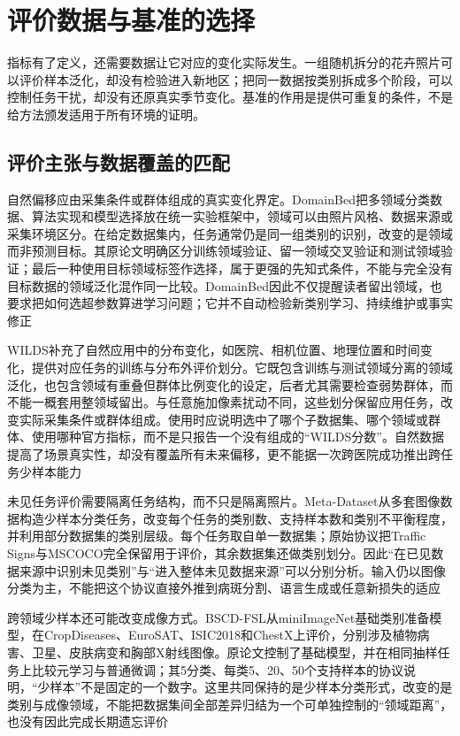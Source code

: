 \section{评价数据与基准的选择}
\label{sec:ket-evaluation-data}

指标有了定义，还需要数据让它对应的变化实际发生。一组随机拆分的花卉照片可以评价样本泛化，却没有检验进入新地区；把同一数据按类别拆成多个阶段，可以控制任务干扰，却没有还原真实季节变化。基准的作用是提供可重复的条件，不是给方法颁发适用于所有环境的证明。

\subsection{评价主张与数据覆盖的匹配}
\label{sec:ket-evaluation-coverage}

自然偏移应由采集条件或群体组成的真实变化界定。DomainBed把多领域分类数据、算法实现和模型选择放在统一实验框架中，领域可以由照片风格、数据来源或采集环境区分。在给定数据集内，任务通常仍是同一组类别的识别，改变的是领域而非预测目标。其原论文明确区分训练领域验证、留一领域交叉验证和测试领域验证；最后一种使用目标领域标签作选择，属于更强的先知式条件，不能与完全没有目标数据的领域泛化混作同一比较。DomainBed因此不仅提醒读者留出领域，也要求把如何选超参数算进学习问题；它并不自动检验新类别学习、持续维护或事实修正

WILDS补充了自然应用中的分布变化，如医院、相机位置、地理位置和时间变化，提供对应任务的训练与分布外评价划分。它既包含训练与测试领域分离的领域泛化，也包含领域有重叠但群体比例变化的设定，后者尤其需要检查弱势群体，而不能一概套用整领域留出。与任意施加像素扰动不同，这些划分保留应用任务，改变实际采集条件或群体组成。使用时应说明选中了哪个子数据集、哪个领域或群体、使用哪种官方指标，而不是只报告一个没有组成的“WILDS分数”。自然数据提高了场景真实性，却没有覆盖所有未来偏移，更不能据一次跨医院成功推出跨任务少样本能力

未见任务评价需要隔离任务结构，而不只是隔离照片。Meta-Dataset从多套图像数据构造少样本分类任务，改变每个任务的类别数、支持样本数和类别不平衡程度，并利用部分数据集的类别层级。每个任务取自单一数据集；原始协议把Traffic Signs与MSCOCO完全保留用于评价，其余数据集还做类别划分。因此“在已见数据来源中识别未见类别”与“进入整体未见数据来源”可以分别分析。输入仍以图像分类为主，不能把这个协议直接外推到病斑分割、语言生成或任意新损失的适应

跨领域少样本还可能改变成像方式。BSCD-FSL从miniImageNet基础类别准备模型，在CropDiseases、EuroSAT、ISIC2018和ChestX上评价，分别涉及植物病害、卫星、皮肤病变和胸部X射线图像。原论文控制了基础模型，并在相同抽样任务上比较元学习与普通微调；其5分类、每类5、20、50个支持样本的协议说明，“少样本”不是固定的一个数字。这里共同保持的是少样本分类形式，改变的是类别与成像领域，不能把数据集间全部差异归结为一个可单独控制的“领域距离”，也没有因此完成长期遗忘评价

